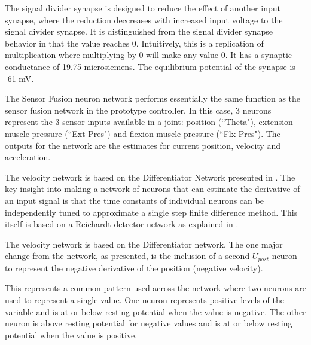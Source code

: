 
The signal divider synapse is designed to reduce the effect of another input
synapse, where the reduction deccreases with increased input voltage to the
signal divider synapse. It is distinguished from the signal divider synapse
behavior in that the value reaches 0. Intuitively, this is a replication of 
multiplication where multiplying by 0 will make any value 0.
It has a synaptic conductance of 19.75 microsiemens. The equilibrium potential 
of the synapse is -61 mV.


The Sensor Fusion neuron network performs essentially the same function as the
sensor fusion network in the prototype controller. In this case, 3 neurons
represent the 3 sensor inputs available in a joint: position (``Theta"),
extension muscle pressure (``Ext Pres") and flexion muscle pressure
(``Flx Pres"). The outputs for the network are the estimates for current 
position, velocity and acceleration.



The velocity network is based on the Differentiator Network presented in 
\cite{NickFunctionalSubnetwork}. The key insight into making a network
of neurons that can estimate the derivative of an input signal is that
the time constants of individual neurons can be independently tuned to 
approximate a single step finite difference method. This itself is based
on a Reichardt detector network as explained in
\cite{NickFunctionalSubnetwork}.



The velocity network is based on the Differentiator network. 
The one major change from the network,
as presented, is the inclusion of a second $U_{post}$ neuron to 
represent the negative derivative of the position (negative velocity).



This represents
a common pattern used across the network where two neurons are used to represent
a single value. One neuron represents positive levels of the variable and is 
at or below resting potential when the value is negative. The other neuron is
above resting potential for negative values and is at or below resting potential
when the value is positive. 

